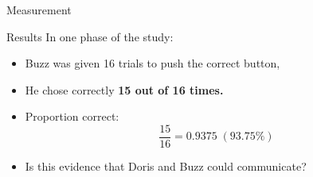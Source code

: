 \documentclass[slidestop,compress,mathserif]{beamer}
\begin{document}
\begin{frame}{Measurement}
    \begin{block}{Results}
        In one phase of the study:
        \begin{itemize}
            \item Buzz was given 16 trials to push the correct button,
            \item He chose correctly \textbf{15 out of 16 times.}
        \end{itemize}
    \end{block}
    \vspace{0.3cm}
    \begin{itemize}
        \item Proportion correct: \[\frac{15}{16} = 0.9375\; (93.75\%)\]
        \item Is this evidence that Doris and Buzz could communicate?
    \end{itemize}
    \vspace{0.5cm}
    \begin{center}
    \end{center}
\end{frame}

\end{document}
